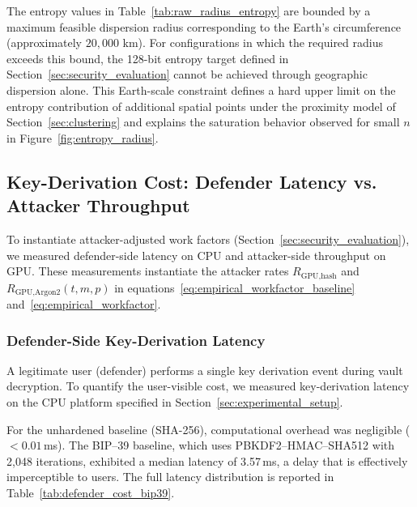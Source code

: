 \documentclass[journal,article,accept,pdftex,moreauthors]{Definitions/mdpi}
\begin{document}
The entropy values in Table~\ref{tab:raw_radius_entropy} are bounded by a maximum feasible dispersion radius corresponding to the Earth’s circumference (approximately $20{,}000$ km). For configurations in which the required radius exceeds this bound, the 128-bit entropy target defined in Section~\ref{sec:security_evaluation} cannot be achieved through geographic dispersion alone. This Earth-scale constraint defines a hard upper limit on the entropy contribution of additional spatial points under the proximity model of Section~\ref{sec:clustering} and explains the saturation behavior observed for small $n$ in Figure~\ref{fig:entropy_radius}.





\subsection{Key-Derivation Cost: Defender Latency vs. Attacker Throughput}
\label{sec:hardware_benchmarks}

To instantiate attacker-adjusted work factors (Section~\ref{sec:security_evaluation}), we measured defender-side latency on CPU and attacker-side throughput on GPU. These measurements instantiate the attacker rates $R_{\text{GPU,hash}}$ and $R_{\text{GPU,Argon2}}(t,m,p)$ in equations~\ref{eq:empirical_workfactor_baseline} and~\ref{eq:empirical_workfactor}.

\subsubsection{Defender-Side Key-Derivation Latency}
\label{sec:defender_performance}

A legitimate user (defender) performs a single key derivation event during vault decryption. To quantify the user-visible cost, we measured key-derivation latency on the CPU platform specified in Section~\ref{sec:experimental_setup}.

For the unhardened baseline (SHA-256), computational overhead was negligible ($<0.01$\,ms). The BIP--39 baseline, which uses PBKDF2--HMAC--SHA512 with 2{,}048 iterations, exhibited a median latency of 3.57\,ms, a delay that is effectively imperceptible to users. The full latency distribution is reported in Table~\ref{tab:defender_cost_bip39}.
\end{document}

